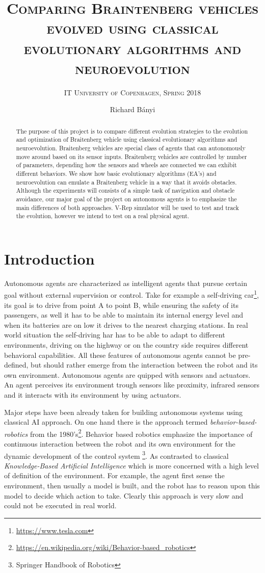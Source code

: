 \documentclass[format=acmsmall, review=false, screen=true]{acmart}
\author{Richard Bányi}
\title{\textsc{Comparing Braintenberg vehicles evolved using classical evolutionary algorithms and neuroevolution}}
\subtitle{\textsc{IT University of Copenhagen, Spring 2018}}
\begin{document}
\begin{abstract}
The purpose of this project is to compare different evolution strategies to the evolution and optimization of Braitenberg vehicle using classical evolutionary algorithms and neuroevolution. Braitenberg vehicles are special class of agents that can autonomously move around based on its sensor inputs. Braitenberg vehicles are controlled by number of parameters, depending how the sensors and wheels are connected we can exhibit different behaviors. We show how basic evolutionary algorithms (EA’s) and neuroevolution can emulate a Braitenberg vehicle in a way that it avoids obstacles. Although the experiments will consists of a simple task of navigation and obstacle avoidance, our major goal of the project on autonomous agents is to emphasize the main differences  of both approaches. V-Rep simulator will be used to test and track the evolution, however we intend to test on a real physical agent.
	\end{abstract}
\maketitle


\section{Introduction}

Autonomous agents are characterized as intelligent agents that pursue certain goal without external supervision or control. Take for example a self-driving car\footnote{\url{https://www.tesla.com}}, its goal is to drive from point A to point B, while ensuring the safety of its passengers, as well it has to be able to maintain its internal energy level and when its batteries are on low it drives to the nearest charging stations. In real world situation the self-driving har has to be able to adapt to different environments, driving on the highway or on the country side requires different behavioral capabilities. All these features of autonomous agents cannot be pre-defined, but should rather emerge from the interaction between the robot and its own environment. Autonomous agents are quipped with sensors and actuators. An agent perceives its environment trough sensors like proximity, infrared sensors and it interacts with its environment by using actuators. 

Major steps have been already taken for building autonomous systems using classical AI approach. On one hand there is the approach termed \emph{behavior-based-robotics} from the 1980's\footnote{\url{https://en.wikipedia.org/wiki/Behavior-based_robotics}}. Behavior based robotics emphasize the importance of continuous interaction between the robot and its own environment for the dynamic development of the control system \footnote{Springer Handbook of Robotics}. As contrasted to classical \emph{Knowledge-Based Artificial Intelligence} which is more concerned with a high level of definition of the environment. For example, the agent first sense the environment, then usually a model is built, and the robot has to reason upon this model to decide which action to take. Clearly this approach is very slow and could not be executed in real world.
\end{document}
